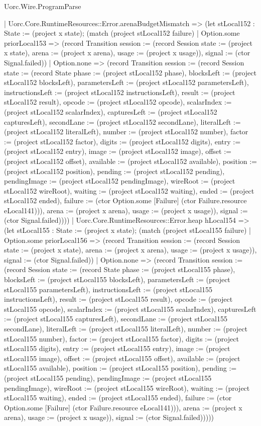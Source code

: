 \begin{lexlean}{Uorc.Wire.ProgramParse}
\begin{semanticmodule}
{      | Uorc.Core.RuntimeResources::Error.arenaBudgetMismatch => (let stLocal152 : State := (project x state); (match (project stLocal152 failure)
        | Option.some priorLocal153 => (record Transition {session := (record Session {state := (project x state), arena := (project x arena), usage := (project x usage)}), signal := (ctor Signal.failed)})
        | Option.none => (record Transition {session := (record Session {state := (record State {phase := (project stLocal152 phase), blocksLeft := (project stLocal152 blocksLeft), parametersLeft := (project stLocal152 parametersLeft), instructionsLeft := (project stLocal152 instructionsLeft), result := (project stLocal152 result), opcode := (project stLocal152 opcode), scalarIndex := (project stLocal152 scalarIndex), capturesLeft := (project stLocal152 capturesLeft), secondLane := (project stLocal152 secondLane), literalLeft := (project stLocal152 literalLeft), number := (project stLocal152 number), factor := (project stLocal152 factor), digits := (project stLocal152 digits), entry := (project stLocal152 entry), image := (project stLocal152 image), offset := (project stLocal152 offset), available := (project stLocal152 available), position := (project stLocal152 position), pending := (project stLocal152 pending), pendingImage := (project stLocal152 pendingImage), wireRoot := (project stLocal152 wireRoot), waiting := (project stLocal152 waiting), ended := (project stLocal152 ended), failure := (ctor Option.some [Failure] (ctor Failure.resource eLocal141))}), arena := (project x arena), usage := (project x usage)}), signal := (ctor Signal.failed)})))
      | Uorc.Core.RuntimeResources::Error.heap hLocal154 => (let stLocal155 : State := (project x state); (match (project stLocal155 failure)
        | Option.some priorLocal156 => (record Transition {session := (record Session {state := (project x state), arena := (project x arena), usage := (project x usage)}), signal := (ctor Signal.failed)})
        | Option.none => (record Transition {session := (record Session {state := (record State {phase := (project stLocal155 phase), blocksLeft := (project stLocal155 blocksLeft), parametersLeft := (project stLocal155 parametersLeft), instructionsLeft := (project stLocal155 instructionsLeft), result := (project stLocal155 result), opcode := (project stLocal155 opcode), scalarIndex := (project stLocal155 scalarIndex), capturesLeft := (project stLocal155 capturesLeft), secondLane := (project stLocal155 secondLane), literalLeft := (project stLocal155 literalLeft), number := (project stLocal155 number), factor := (project stLocal155 factor), digits := (project stLocal155 digits), entry := (project stLocal155 entry), image := (project stLocal155 image), offset := (project stLocal155 offset), available := (project stLocal155 available), position := (project stLocal155 position), pending := (project stLocal155 pending), pendingImage := (project stLocal155 pendingImage), wireRoot := (project stLocal155 wireRoot), waiting := (project stLocal155 waiting), ended := (project stLocal155 ended), failure := (ctor Option.some [Failure] (ctor Failure.resource eLocal141))}), arena := (project x arena), usage := (project x usage)}), signal := (ctor Signal.failed)}))))
}
\end{semanticmodule}
\end{lexlean}
